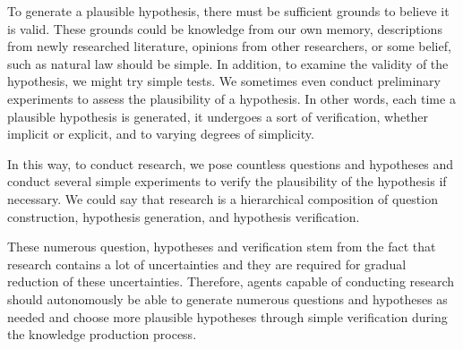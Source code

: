 To generate a plausible hypothesis, there must be sufficient grounds to believe it is valid. These grounds could be knowledge from our own memory, descriptions from newly researched literature, opinions from other researchers, or some belief, such as natural law should be simple. In addition, to examine the validity of the hypothesis, we might try simple tests. We sometimes even conduct preliminary experiments to assess the plausibility of a hypothesis. In other words, each time a plausible hypothesis is generated, it undergoes a sort of verification, whether implicit or explicit, and to varying degrees of simplicity.

In this way, to conduct research, we pose countless questions and hypotheses and conduct several simple  experiments to verify the plausibility of the hypothesis if necessary. We could say that research is a hierarchical composition of question construction, hypothesis generation, and hypothesis verification. 

These numerous question, hypotheses and verification stem from the fact that research contains a lot of uncertainties and they are required for gradual reduction of these uncertainties. Therefore, agents capable of conducting research should autonomously be able to generate numerous questions and hypotheses as needed and choose more plausible hypotheses through simple verification during the knowledge production process.




